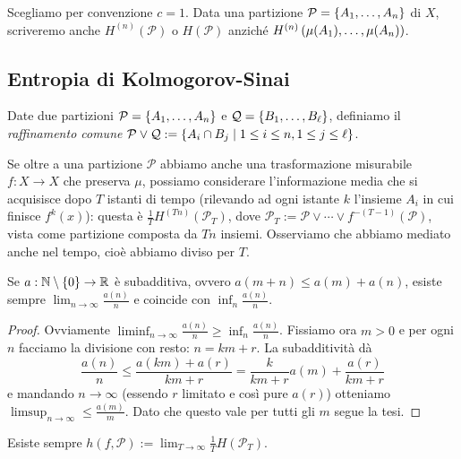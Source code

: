 Scegliamo per convenzione $c=1$.
Data una partizione $\mathcal{P}=\left\{A_1,\dots,A_n\right\}$ di $X$, scriveremo anche $H^{(n)}(\mathcal{P})$ o $H(\mathcal{P})$
anziché $H^{(n)}\left(\mu(A_1),\dots,\mu(A_n)\right)$.

\subsection{Entropia di Kolmogorov-Sinai}

\begin{defi}Date due partizioni $\mathcal{P}=\left\{A_1,\dots,A_n\right\}$ e $\mathcal{Q}=\left\{B_1,\dots,B_\ell\right\}$,
definiamo il \emph{raffinamento comune} $\mathcal{P}\vee\mathcal{Q}:=\left\{A_i\cap B_j\mid 1\le i\le n,1\le j\le \ell\right\}$.
\end{defi}

Se oltre a una partizione $\mathcal{P}$ abbiamo anche una trasformazione misurabile $f:X\to X$ che preserva $\mu$,
possiamo considerare l'informazione media che si acquisisce dopo $T$ istanti di tempo (rilevando
ad ogni istante $k$ l'insieme $A_i$ in cui finisce $f^k(x)$): questa è $\frac{1}{T}H^{(Tn)}(\mathcal{P}_T)$,
dove $\mathcal{P}_T:=\mathcal{P}\vee\cdots\vee f^{-(T-1)}(\mathcal{P})$, vista come partizione composta
da $Tn$ insiemi. Osserviamo che abbiamo mediato anche nel tempo, cioè abbiamo diviso per $T$.

\begin{lemma}[Fekete]\label{fekete} Se $a:\mathbb{N}\setminus\left\{0\right\}\to\mathbb{R}$ è subadditiva, ovvero $a(m+n)\le a(m)+a(n)$, esiste sempre
$\lim_{n\to\infty}\frac{a(n)}{n}$ e coincide con $\inf_n\frac{a(n)}{n}$.
\end{lemma}

\begin{proof}Ovviamente $\liminf_{n\to\infty}\frac{a(n)}{n}\ge\inf_n\frac{a(n)}{n}$. Fissiamo ora $m>0$
e per ogni $n$ facciamo la divisione con resto: $n=km+r$. La subadditività dà
\[ \frac{a(n)}{n}\le\frac{a(km)+a(r)}{km+r}=\frac{k}{km+r}a(m)+\frac{a(r)}{km+r} \]
e mandando $n\to\infty$ (essendo $r$ limitato e così pure $a(r)$) otteniamo $\limsup_{n\to\infty}\le\frac{a(m)}{m}$.
Dato che questo vale per tutti gli $m$ segue la tesi.
\end{proof}

\begin{cor}Esiste sempre $h(f,\mathcal{P}):=\lim_{T\to\infty}\frac{1}{T}H(\mathcal{P}_T)$.
\end{cor}

